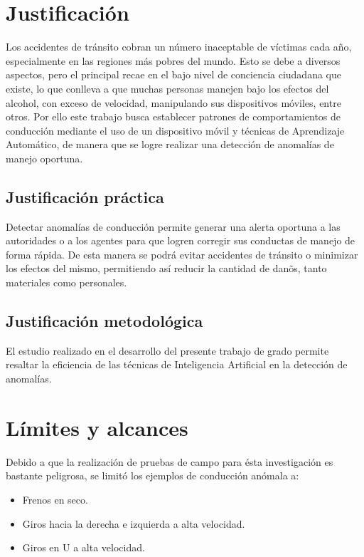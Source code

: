 
\section{Justificación}

Los accidentes de tránsito cobran un número inaceptable de víctimas cada a\~{n}o, especialmente en las regiones m\'{a}s pobres del mundo. Esto se debe a diversos aspectos, pero el principal recae en el bajo nivel de conciencia ciudadana que existe, lo que conlleva a que muchas personas manejen bajo los efectos del alcohol, con exceso de velocidad, manipulando sus dispositivos m\'{o}viles, entre otros. Por ello este trabajo busca establecer patrones de comportamientos de conducci\'{o}n mediante el uso de un dispositivo m\'{o}vil y t\'{e}cnicas de Aprendizaje Autom\'{a}tico, de manera que se logre realizar una detecci\'{o}n de anomal\'{i}as de manejo oportuna.

\subsection{Justificaci\'{o}n pr\'{a}ctica}

Detectar anomal\'{i}as de conducci\'{o}n permite generar una alerta oportuna a las autoridades o a los agentes para que logren corregir sus conductas de manejo de forma r\'{a}pida. De esta manera se podr\'{a} evitar accidentes de tr\'{a}nsito o minimizar los efectos del mismo, permitiendo as\'{i} reducir la cantidad de dan\~{o}s, tanto materiales como personales.

\subsection{Justificaci\'{o}n metodol\'{o}gica}

El estudio realizado en el desarrollo del presente trabajo de grado permite resaltar la eficiencia de las t\'{e}cnicas de Inteligencia Artificial en la detecci\'{o}n de anomal\'{i}as.

\section{L\'{i}mites y alcances}

Debido a que la realizaci\'{o}n de pruebas de campo para \'{e}sta investigaci\'{o}n es bastante peligrosa, se limit\'{o} los ejemplos de conducci\'{o}n an\'{o}mala a:

\begin{itemize}
\item Frenos en seco.
\item Giros hacia la derecha e izquierda a alta velocidad.
\item Giros en U a alta velocidad.
\end{itemize}

